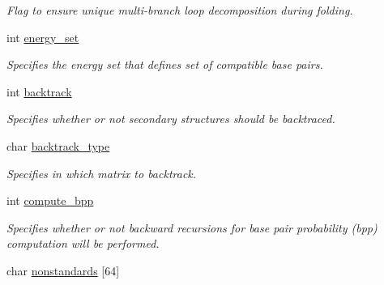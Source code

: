 \begin{DoxyCompactItemize}
\begin{DoxyCompactList}\small\item\em Flag to ensure unique multi-\/branch loop decomposition during folding. \end{DoxyCompactList}\item 
\mbox{\label{group__model__details_a5eee4e3b468eb690d1407e0178dafb3f}} 
int \hyperlink{group__model__details_a5eee4e3b468eb690d1407e0178dafb3f}{energy\+\_\+set}
\begin{DoxyCompactList}\small\item\em Specifies the energy set that defines set of compatible base pairs. \end{DoxyCompactList}\item 
\mbox{\label{group__model__details_a31f4471608cbdd03887f63c281823adb}} 
int \hyperlink{group__model__details_a31f4471608cbdd03887f63c281823adb}{backtrack}
\begin{DoxyCompactList}\small\item\em Specifies whether or not secondary structures should be backtraced. \end{DoxyCompactList}\item 
\mbox{\label{group__model__details_abb265da25121d22ed11c8435861f0e53}} 
char \hyperlink{group__model__details_abb265da25121d22ed11c8435861f0e53}{backtrack\+\_\+type}
\begin{DoxyCompactList}\small\item\em Specifies in which matrix to backtrack. \end{DoxyCompactList}\item 
\mbox{\label{group__model__details_aa0c3e03d9064363e27adcc92b8d0380f}} 
int \hyperlink{group__model__details_aa0c3e03d9064363e27adcc92b8d0380f}{compute\+\_\+bpp}
\begin{DoxyCompactList}\small\item\em Specifies whether or not backward recursions for base pair probability (bpp) computation will be performed. \end{DoxyCompactList}\item 
\mbox{\label{group__model__details_a3fde4ac9eaf972f503c7a76726cefb59}} 
char \hyperlink{group__model__details_a3fde4ac9eaf972f503c7a76726cefb59}{nonstandards} \mbox{[}64\mbox{]}

\end{DoxyCompactItemize}
